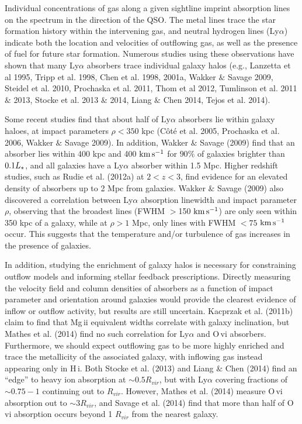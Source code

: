 \documentclass[twocolumn,tighten]{aastex6}
\begin{document}
Individual concentrations of gas along a given sightline imprint absorption lines on the spectrum in the direction of the QSO. The metal lines trace the star formation history within the intervening gas, and neutral hydrogen lines (Ly$\alpha$) indicate both the location and velocities of outflowing gas, as well as the presence of fuel for future star formation. Numerous studies using these observations have shown that many Ly$\alpha$ absorbers trace individual galaxy halos (e.g., Lanzetta et al 1995, Tripp et al. 1998, Chen et al. 1998, 2001a, Wakker $\&$ Savage 2009, Steidel et al. 2010, Prochaska et al. 2011, Thom et al 2012, Tumlinson et al. 2011 $\&$ 2013, Stocke et al. 2013 $\&$ 2014, Liang $\&$ Chen 2014, Tejos et al. 2014).

Some recent studies find that about half of Ly$\alpha$ absorbers lie within galaxy haloes, at impact parameters $\rho<350$ kpc (C\^{o}t\'{e} et al. 2005, Prochaska et al. 2006, Wakker $\&$ Savage 2009). In addition, Wakker $\&$ Savage (2009) find that an absorber lies within 400 kpc and 400 $\rm km\, s^{-1}$ for $90\%$ of galaxies brighter than $0.1L_{\**}$, and all galaxies have a Ly$\alpha$ absorber within 1.5 Mpc. Higher redshift studies, such as Rudie et al. (2012a) at $2<z<3$, find evidence for an elevated density of absorbers up to 2 Mpc from galaxies. Wakker $\&$ Savage (2009) also discovered a correlation between Ly$\alpha$ absorption linewidth and impact parameter $\rho$, observing that the broadest lines (FWHM $>$150 $\rm km\, s^{-1}$) are only seen within 350 kpc of a galaxy, while at $\rho>1$ Mpc, only lines with FWHM $<75$ $\rm km\, s^{-1}$ occur. This suggests that the temperature and/or turbulence of gas increases in the presence of galaxies.

In addition, studying the enrichment of galaxy halos is necessary for constraining outflow models and informing stellar feedback prescriptions. Directly measuring the velocity field and column densities of absorbers as a function of impact parameter and orientation around galaxies would provide the clearest evidence of inflow or outflow activity, but results are still uncertain. Kacprzak et al. (2011b) claim to find that Mg\,{\sc ii} equivalent widths correlate with galaxy inclination, but Mathes et al. (2014) find no such correlation for Ly$\alpha$ and O\,{\sc vi} absorbers. Furthermore, we should expect outflowing gas to be more highly enriched and trace the metallicity of the associated galaxy, with inflowing gas instead appearing only in H\,{\sc i}. Both Stocke et al. (2013) and Liang $\&$ Chen (2014) find an ``edge'' to heavy ion absorption at $\sim0.5R_{vir}$, but with Ly$\alpha$ covering fractions of $\sim0.75-1$ continuing out to $R_{vir}$. However, Mathes et al. (2014) measure O\,{\sc vi} absorption out to $\sim3 R_{vir}$, and Savage et al. (2014) find that more than half of O\,{\sc vi} absorption occurs beyond 1 $R_{vir}$ from the nearest galaxy.
\end{document}
